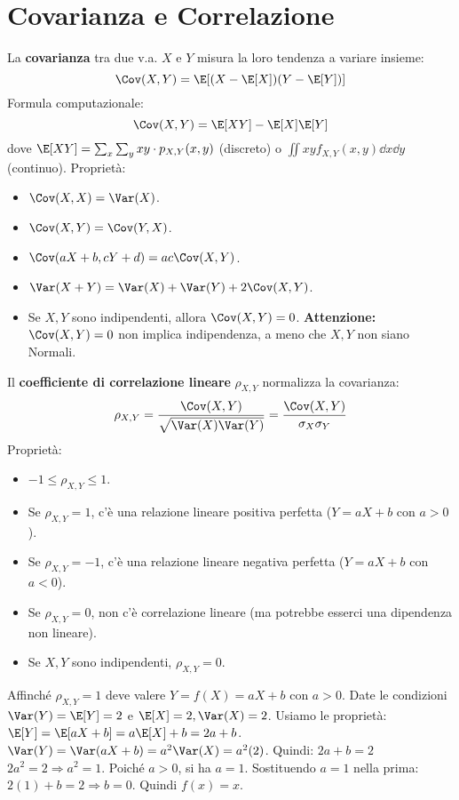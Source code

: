 \section{Covarianza e Correlazione}
\begin{definition}[Covarianza]
La \textbf{covarianza} tra due v.a. $X$ e $Y$ misura la loro tendenza a variare insieme:
\[ \Cov(X,Y) = \E[(X-\E[X])(Y-\E[Y])] \]
Formula computazionale:
\[ \Cov(X,Y) = \E[XY] - \E[X]\E[Y] \]
dove $\E[XY] = \sum_x \sum_y xy \cdot p_{X,Y}(x,y)$ (discreto) o $\iint xy f_{X,Y}(x,y) \dd x \dd y$ (continuo).
Proprietà:
\begin{itemize}
    \item $\Cov(X,X) = \Var(X)$.
    \item $\Cov(X,Y) = \Cov(Y,X)$.
    \item $\Cov(aX+b, cY+d) = ac \Cov(X,Y)$.
    \item $\Var(X+Y) = \Var(X) + \Var(Y) + 2\Cov(X,Y)$.
    \item Se $X, Y$ sono indipendenti, allora $\Cov(X,Y) = 0$. \textbf{Attenzione:} $\Cov(X,Y)=0$ non implica indipendenza, a meno che $X,Y$ non siano Normali.
\end{itemize}
\end{definition}

\begin{definition}
Il \textbf{coefficiente di correlazione lineare} $\rho_{X,Y}$ normalizza la covarianza:
\[ \rho_{X,Y} = \frac{\Cov(X,Y)}{\sqrt{\Var(X)\Var(Y)}} = \frac{\Cov(X,Y)}{\sigma_X \sigma_Y} \]
Proprietà:
\begin{itemize}
    \item $-1 \le \rho_{X,Y} \le 1$.
    \item Se $\rho_{X,Y} = 1$, c'è una relazione lineare positiva perfetta ($Y=aX+b$ con $a>0$).
    \item Se $\rho_{X,Y} = -1$, c'è una relazione lineare negativa perfetta ($Y=aX+b$ con $a<0$).
    \item Se $\rho_{X,Y} = 0$, non c'è correlazione lineare (ma potrebbe esserci una dipendenza non lineare).
    \item Se $X,Y$ sono indipendenti, $\rho_{X,Y}=0$.
\end{itemize}
\end{definition}
\begin{example}
Affinché $\rho_{X,Y}=1$ deve valere $Y = f(X) = aX+b$ con $a>0$.
Date le condizioni $\Var(Y) = \E[Y]=2$ e $\E[X]=2, \Var(X)=2$.
Usiamo le proprietà:
$\E[Y] = \E[aX+b] = a\E[X]+b = 2a+b$.
$\Var(Y) = \Var(aX+b) = a^2\Var(X) = a^2(2)$.
Quindi:
$2a+b = 2$
$2a^2 = 2 \Rightarrow a^2 = 1$. Poiché $a>0$, si ha $a=1$.
Sostituendo $a=1$ nella prima: $2(1)+b=2 \Rightarrow b=0$.
Quindi $f(x) = x$.
\end{example}



